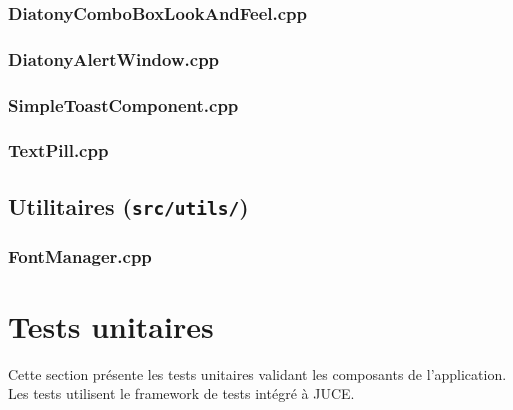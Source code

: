 \subsection{DiatonyComboBoxLookAndFeel.cpp}


\subsection{DiatonyAlertWindow.cpp}


\subsection{SimpleToastComponent.cpp}


\subsection{TextPill.cpp}


\newpage
\section{Utilitaires (\texttt{src/utils/})}

\subsection{FontManager.cpp}


\chapter{Tests unitaires}

Cette section présente les tests unitaires validant les composants de l'application. Les tests utilisent le framework de tests intégré à JUCE.

